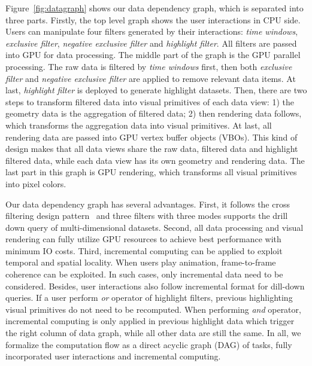 Figure~\ref{fig:datagraph} shows our data dependency graph, which is separated into three parts. Firstly, the top level graph shows the user interactions in CPU side. Users can manipulate four filters generated by their interactions: \emph{time windows}, \emph{exclusive filter}, \emph{negative exclusive filter} and \emph{highlight filter}. All filters are passed into GPU  for data processing. The middle part of the graph is the GPU parallel processing. The raw data is filtered by \emph{time windows} first, then both \emph{exclusive filter} and \emph{negative exclusive filter} are applied to remove relevant data items. At last, \emph{highlight filter} is deployed to generate highlight datasets. Then, there are two steps to transform filtered data into visual primitives of each data view: 1) the geometry data is the aggregation of filtered data; 2) then rendering data follows, which transforms the aggregation data into visual primitives. At last, all rendering data are passed into GPU vertex buffer objects (VBOs). This kind of design makes that all data views share the raw data, filtered data and highlight filtered data, while each data view has its own geometry and rendering data. The last part in this graph is GPU rendering, which transforms all visual primitives into pixel colors.  




Our data dependency graph has several advantages. First, it follows the cross filtering design pattern~\cite{weaver2010cross} and three filters with three modes supports the drill down query of multi-dimensional datasets. 
Second, all data processing and visual rendering can fully utilize GPU resources to achieve best performance with minimum IO costs. 
Third,  incremental computing can be applied to exploit temporal and spatial locality. When users play animation, frame-to-frame coherence can be exploited. In such cases, only incremental data need to be considered. Besides, user interactions also follow incremental format for dill-down queries. If a user perform \emph{or} operator of highlight filters, previous highlighting visual primitives do not need to be recomputed. When performing \emph{and} operator, incremental computing is only applied in previous highlight data which trigger the right column of data graph, while all other data are still the same. In all, we formalize the computation flow as a direct acyclic graph (DAG) of tasks, fully incorporated user interactions and incremental computing.

